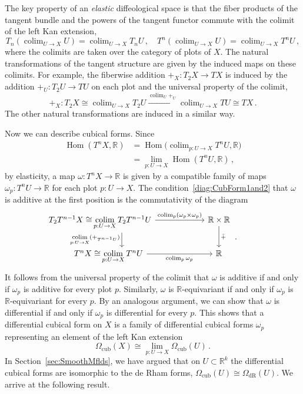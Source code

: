 \documentclass[12pt,reqno, a4paper]{amsart}
\numberwithin{equation}{section}
\theoremstyle{plain}
\theoremstyle{definition}
\theoremstyle{remark}
\DeclareMathOperator{\Hom}{Hom}
\DeclareMathOperator*{\Lim}{lim}
\DeclareMathOperator*{\Colim}{colim}
\newcommand{\bbR}{\mathbb{R}}
\newcommand{\Radd}{\hat{+}}
\begin{document}
The key property of an \emph{elastic} diffeological space is that the fiber products of the tangent bundle and the powers of the tangent functor commute with the colimit of the left Kan extension,
\begin{equation*}
  T_n ( \Colim_{U \to X} U ) = \Colim_{U \to X} T_n U
  \,,\quad
  T^n ( \Colim_{U \to X} U ) = \Colim_{U \to X} T^n U
  \,,
\end{equation*}
where the colimits are taken over the category of plots of $X$. The natural transformations of the tangent structure are given by the induced maps on these colimits. For example, the fiberwise addition $+_X: T_2 X \to TX$ is induced by the addition $+_U: T_2 U \to TU$ on each plot and the universal property of the colimit,
\begin{equation*}
  +_X: T_2 X \cong \Colim_{U \to X} T_2 U
 \xrightarrow{\Colim_U +_U} \Colim_{U \to X} TU \cong TX
  \,.
\end{equation*}
The other natural transformations are induced in a similar way. 

Now we can describe cubical forms. Since
\begin{equation*}
\begin{split}
  \Hom(T^n X, \bbR)
  &= \Hom\bigl( \Colim_{p:U \to X} T^n U, \bbR \bigr)
  \\
  &= \Lim_{p:U \to X} \Hom( T^n U, \bbR)
  \,,
\end{split}
\end{equation*}
by elasticity, a map $\omega: T^n X \to \bbR$ is given by a compatible family of maps $\omega_p: T^n U \to \bbR$ for each plot $p: U \to X$. The condition~\eqref{diag:CubForm1and2} that $\omega$ is additive at the first position is the commutativity of the diagram
\begin{equation*}
\begin{tikzcd}[column sep=6em]
  \mathllap{T_2 T^{n-1} X \cong} \Colim\limits_{p:U \to X} T_2 T^{n-1} U
  \ar[r, "{\Colim_p (\omega_p \times \omega_p)}"]
  \ar[d, "{\Colim\limits_{p:U \to X} (+_{T^{n-1} U})}"']
  &
  \bbR \times \bbR
  \arrow[d, "\Radd"] \\
  \mathllap{T^n X \cong} \Colim\limits_{p:U \to X} T^n U
  \ar[r, "\Colim_p \omega_p"']
  &
  \bbR
\end{tikzcd}
  \,.
\end{equation*}
It follows from the universal property of the colimit that $\omega$ is additive if and only if $\omega_p$ is additive for every plot $p$. Similarly, $\omega$ is $\bbR$-equivariant if and only if $\omega_p$ is $\bbR$-equivariant for every $p$. By an analogous argument, we can show that $\omega$ is differential if and only if $\omega_p$ is differential for every $p$. This shows that a differential cubical form on $X$ is a family of differential cubical forms $\omega_p$ representing an element of the left Kan extension
\begin{equation*}
  \Omega_\mathrm{cub}(X) \cong \Lim_{p:U \to X} \Omega_\mathrm{cub}(U)
  \,.
\end{equation*}
In Section~\ref{sec:SmoothMflds}, we have argued that on $U \subset \bbR^k$ the differential cubical forms are isomorphic to the de Rham forms, $\Omega_\mathrm{cub}(U) \cong \Omega_\mathrm{dR}(U)$. We arrive at the following result.
\end{document}

